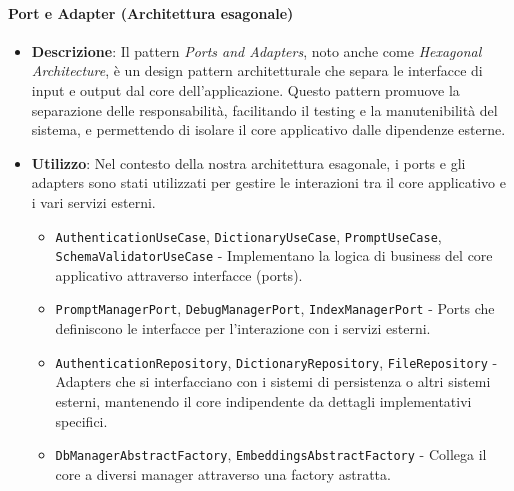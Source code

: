 \paragraph{Port e Adapter (Architettura esagonale)}
\begin{itemize}
    \item \textbf{Descrizione}: Il pattern \textit{Ports and Adapters}, noto anche come \textit{Hexagonal Architecture}, è un design pattern architetturale che separa le interfacce di input e output dal core dell'applicazione. Questo pattern promuove la separazione delle responsabilità, facilitando il testing e la manutenibilità del sistema, e permettendo di isolare il core applicativo dalle dipendenze esterne.
    \item \textbf{Utilizzo}: Nel contesto della nostra architettura esagonale, i ports e gli adapters sono stati utilizzati per gestire le interazioni tra il core applicativo e i vari servizi esterni.
    \begin{itemize}
        \item \texttt{AuthenticationUseCase}, \texttt{DictionaryUseCase}, \texttt{PromptUseCase}, \texttt{SchemaValidatorUseCase} - Implementano la logica di business del core applicativo attraverso interfacce (ports).
        \item \texttt{PromptManagerPort}, \texttt{DebugManagerPort}, \texttt{IndexManagerPort} - Ports che definiscono le interfacce per l'interazione con i servizi esterni.
        \item \texttt{AuthenticationRepository}, \texttt{DictionaryRepository}, \texttt{FileRepository} - Adapters che si interfacciano con i sistemi di persistenza o altri sistemi esterni, mantenendo il core indipendente da dettagli implementativi specifici.
        \item \texttt{DbManagerAbstractFactory}, \texttt{EmbeddingsAbstractFactory} - Collega il core a diversi manager attraverso una factory astratta.
    \end{itemize}
\end{itemize}

